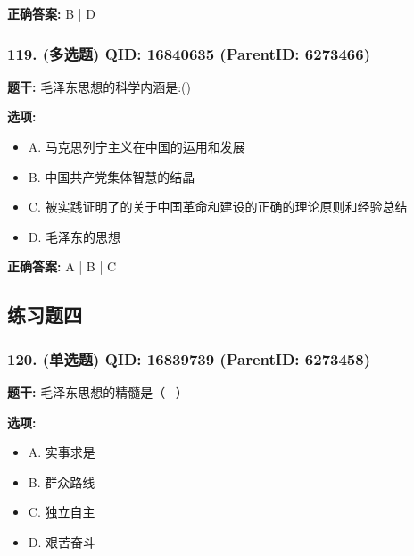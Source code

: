 \documentclass[12pt,UTF8]{ctexart}
\begin{document}
\textbf{正确答案:}
B | D

\vspace{0.3em}\hrulefill\vspace{0.7em}

\subsubsection*{119. (多选题) \small QID: 16840635 (ParentID: 6273466)}

\textbf{题干:}
毛泽东思想的科学内涵是:()



\textbf{选项:}
\begin{itemize}[leftmargin=*]

  \item A. 马克思列宁主义在中国的运用和发展

  \item B. 中国共产党集体智慧的结晶

  \item C. 被实践证明了的关于中国革命和建设的正确的理论原则和经验总结

  \item D. 毛泽东的思想

\end{itemize}

\textbf{正确答案:}
A | B | C

\vspace{0.3em}\hrulefill\vspace{0.7em}

\subsection*{练习题四}

\subsubsection*{120. (单选题) \small QID: 16839739 (ParentID: 6273458)}

\textbf{题干:}
毛泽东思想的精髓是（  ）



\textbf{选项:}
\begin{itemize}[leftmargin=*]

  \item A. 实事求是

  \item B. 群众路线

  \item C. 独立自主

  \item D. 艰苦奋斗

\end{itemize}
\end{document}
